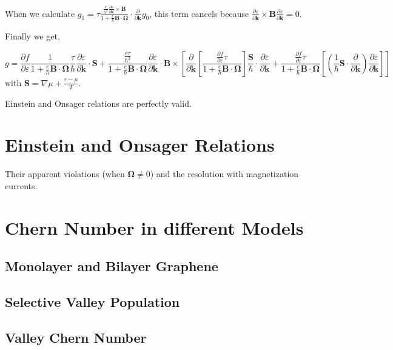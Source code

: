 \documentclass{revtex4-2}
\newcommand{\bvec}[1]{{\mathbf #1}}
\begin{document}
When we calculate $g_1 = \tau \frac{\frac{e}{\hbar^2} \frac{\partial \varepsilon}{\partial \bvec{k}} \times \bvec{B}}{1 + \frac{e}{\hbar} \bvec{B}\cdot\bvec{\Omega}} \cdot\frac{\partial}{\partial \bvec{k}} g_0$, this term cancels because $\frac{\partial \varepsilon}{\partial \bvec{k}} \times \bvec{B}  \frac{\partial \varepsilon}{\partial \bvec{k}} = 0$.

Finally we get,

\begin{equation}
g = \frac{\partial f} {\partial \varepsilon}\frac{1}{1 + \frac{e}{\hbar} \bvec{B}\cdot\bvec{\Omega}}
\frac{\tau}{\hbar} \frac{\partial \varepsilon}{\partial \bvec{k}}\cdot  \bvec{S} + \frac{\frac{e \tau}{\hbar^2} }{1 + \frac{e}{\hbar} \bvec{B}\cdot\bvec{\Omega}} \frac{\partial \varepsilon}{\partial \bvec{k}} \cdot \bvec{B} \times \left[ \frac{\partial}{\partial \bvec{k}} \left[ \frac{\frac{\partial f} {\partial \varepsilon} \tau}{1 + \frac{e}{\hbar} \bvec{B}\cdot\bvec{\Omega}}
\right] \frac{\bvec{S}}{\hbar} \cdot \frac{\partial \varepsilon}{\partial \bvec{k}} + \frac{\frac{\partial f} {\partial \varepsilon} \tau}{1 + \frac{e}{\hbar} \bvec{B}\cdot\bvec{\Omega}} \left[(\frac{1}{\hbar} \bvec{S}\cdot \frac{\partial }{\partial \bvec{k}} )\frac{\partial \varepsilon}{\partial \bvec{k}} \right] \right]
\end{equation}\label{Eq:g_non_zero_chem_temp_grad}
with $\bvec{S} = \nabla \mu + \frac{\varepsilon - \mu}{T}$.

Einstein and Onsager relations are perfectly valid.

\section{Einstein and Onsager Relations}
Their apparent violations (when $\bvec{\Omega} \neq 0$) and the resolution with magnetization currents.

\section{Chern Number in different Models}
\subsection{Monolayer and Bilayer Graphene}
\subsection{Selective Valley Population}
\subsection{Valley Chern Number}
\end{document}
